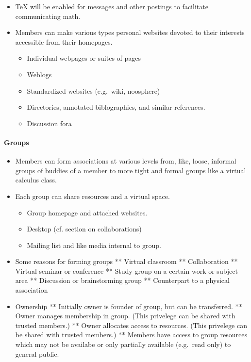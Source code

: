 \begin{itemize}
\begin{itemize}
\begin{itemize}
\item
  TeX will be enabled for messages and other postings to facilitate
  communicating math.
\item
  Members can make various types personal websites devoted to their
  interests accessible from their homepages. 
  \begin{itemize}
  \item
    Individual webpages or suites of pages 
  \item  
    Weblogs 
  \item  
    Standardized websites (e.g.~wiki, noosphere) 
  \item  
    Directories, annotated biblographies, and similar references. 
  \item  
    Discussion fora
  \end{itemize}  
\end{itemize}

\paragraph{Groups}

\begin{itemize}
\item
  Members can form associations at various levels from, like, loose,
  informal groups of buddies of a member to more tight and formal groups
  like a virtual calculus class.
\item
  Each group can share resources and a virtual space. 
  \begin{itemize}
  \item
    Group homepage and attached websites. 
  \item  
    Desktop (cf. section on collaborations)
  \item
    Mailing list and like media internal to group.
  \end{itemize}  
\item
  Some reasons for forming groups ** Virtual classroom ** Collaboration
  ** Virtual seminar or conference ** Study group on a certain work or
  subject area ** Discussion or brainstorming group ** Counterpart to a
  physical association
\item
  Ownership ** Initially owner is founder of group, but can be
  transferred. ** Owner manages membership in group. (This privelege can
  be shared with trusted members.) ** Owner allocates access to
  resources. (This privelege can be shared with trusted members.) **
  Members have access to group resources which may not be availabe or
  only partially available (e.g.~read only) to general public.
\end{itemize}


\end{itemize}
\end{itemize}
